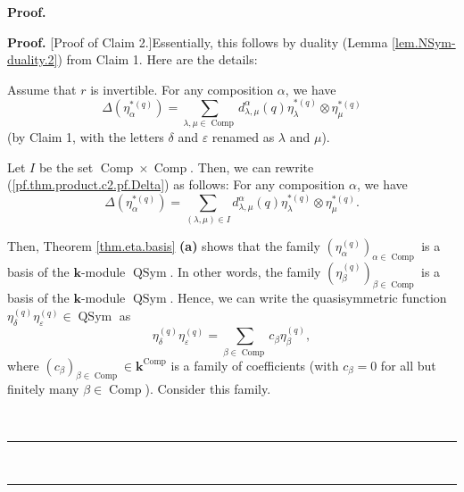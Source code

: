 \documentclass[numbers=enddot,12pt,final,onecolumn,notitlepage]{scrartcl}%
\theoremstyle{definition}
\newenvironment{statement}{\begin{quote}}{\end{quote}}
\newenvironment{proof}[1][Proof]{\noindent\textbf{#1.} }{\ \rule{0.5em}{0.5em}}
\let\sumnonlimits\sum
\renewcommand{\sum}{\sumnonlimits\limits}
\begin{document}
\begin{proof}
\begin{statement}
\end{statement}

\begin{proof}
[Proof of Claim 2.]Essentially, this follows by duality (Lemma
\ref{lem.NSym-duality.2}) from Claim 1. Here are the details:

Assume that $r$ is invertible. For any composition $\alpha$, we have%
\begin{equation}
\Delta\left(  \eta_{\alpha}^{\ast\left(  q\right)  }\right)  =\sum
_{\lambda,\mu\in\operatorname*{Comp}}d_{\lambda,\mu}^{\alpha}\left(  q\right)
\eta_{\lambda}^{\ast\left(  q\right)  }\otimes\eta_{\mu}^{\ast\left(
q\right)  } \label{pf.thm.product.c2.pf.Delta}%
\end{equation}
(by Claim 1, with the letters $\delta$ and $\varepsilon$ renamed as $\lambda$
and $\mu$).

Let $I$ be the set $\operatorname*{Comp}\times\operatorname*{Comp}$. Then, we
can rewrite (\ref{pf.thm.product.c2.pf.Delta}) as follows: For any composition
$\alpha$, we have%
\begin{equation}
\Delta\left(  \eta_{\alpha}^{\ast\left(  q\right)  }\right)  =\sum_{\left(
\lambda,\mu\right)  \in I}d_{\lambda,\mu}^{\alpha}\left(  q\right)
\eta_{\lambda}^{\ast\left(  q\right)  }\otimes\eta_{\mu}^{\ast\left(
q\right)  }. \label{pf.thm.product.c2.pf.DeltaI}%
\end{equation}


Then, Theorem \ref{thm.eta.basis} \textbf{(a)} shows that the family $\left(
\eta_{\alpha}^{\left(  q\right)  }\right)  _{\alpha\in\operatorname*{Comp}}$
is a basis of the $\mathbf{k}$-module $\operatorname*{QSym}$. In other words,
the family $\left(  \eta_{\beta}^{\left(  q\right)  }\right)  _{\beta
\in\operatorname*{Comp}}$ is a basis of the $\mathbf{k}$-module
$\operatorname*{QSym}$. Hence, we can write the quasisymmetric function
$\eta_{\delta}^{\left(  q\right)  }\eta_{\varepsilon}^{\left(  q\right)  }%
\in\operatorname*{QSym}$ as%
\begin{equation}
\eta_{\delta}^{\left(  q\right)  }\eta_{\varepsilon}^{\left(  q\right)  }%
=\sum_{\beta\in\operatorname*{Comp}}c_{\beta}\eta_{\beta}^{\left(  q\right)
}, \label{pf.thm.product.c2.pf.1}%
\end{equation}
where $\left(  c_{\beta}\right)  _{\beta\in\operatorname*{Comp}}\in
\mathbf{k}^{\operatorname*{Comp}}$ is a family of coefficients (with
$c_{\beta}=0$ for all but finitely many $\beta\in\operatorname*{Comp}$).
Consider this family.


\end{proof}
\end{proof}
\end{document}

